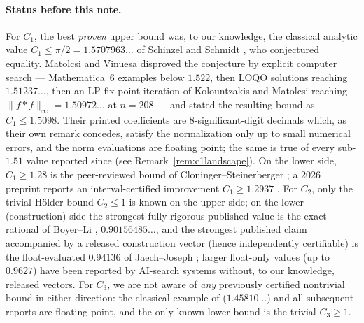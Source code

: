 \documentclass[11pt]{article}
\theoremstyle{remark}
\newcommand{\supnorm}[1]{\lVert #1 \rVert_\infty}
\begin{document}
\paragraph{Status before this note.} For $C_1$, the best \emph{proven}
upper bound was, to our knowledge, the classical analytic value
$C_1 \le \pi/2 = 1.5707963\ldots$ of Schinzel and Schmidt \cite{SS02}, who
conjectured equality. Matolcsi and Vinuesa \cite{MV10} disproved the
conjecture by explicit computer search --- Mathematica~6 examples below
$1.522$, then LOQO solutions reaching $1.51237\ldots$, then an LP fix-point
iteration of Kolountzakis and Matolcsi reaching
$\supnorm{f*f} = 1.50972\ldots$ at $n = 208$ --- and stated the resulting
bound as $C_1 \le 1.5098$. Their printed coefficients are 8-significant-digit
decimals which, as their own remark concedes, satisfy the normalization only
up to small numerical errors, and the norm evaluations are floating point;
the same is true of every sub-$1.51$ value reported since (see
Remark~\ref{rem:c1landscape}). On the lower side, $C_1 \ge 1.28$ is the
peer-reviewed bound of Cloninger--Steinerberger \cite{CS17}; a 2026 preprint
reports an interval-certified improvement $C_1 \ge 1.2937$ \cite{KP26}.
For $C_2$, only the trivial H\"older bound $C_2 \le 1$ is known on the upper
side; on the lower (construction) side the strongest fully rigorous published
value is the exact rational of Boyer--Li \cite{BoyerLi25},
$0.90156485\ldots$, and the strongest published claim accompanied by a
released construction vector (hence independently certifiable) is the
float-evaluated $0.94136$ of Jaech--Joseph \cite{JJ25}; larger float-only
values (up to $0.9627$) have been reported by AI-search systems
\cite{MathScale25,SimpleTES26} without, to our knowledge, released vectors. For $C_3$, we are not aware of \emph{any}
previously certified nontrivial bound in either direction: the classical
example of \cite{MV10} ($1.45810\ldots$) and all subsequent reports
\cite{AlphaEvolve25,MathScale25,SimpleTES26} are floating point, and the only
known lower bound is the trivial $C_3 \ge 1$.
\end{document}
